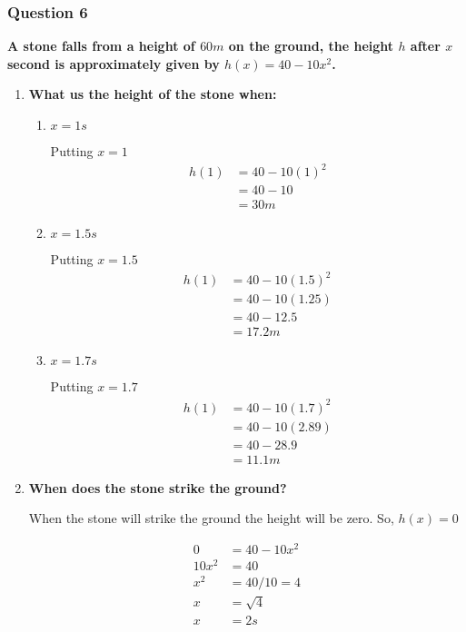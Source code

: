\documentclass[crop=false,fleqn]{standalone}
\begin{document}
    \subsubsection{Question 6}
    \textbf{
        A stone falls from a height of $60m$ on the ground, the height $h$
        after $x$ second is approximately given by $h(x)=40-10x^2$.
    }

    \begin{enumerate}
        \item \textbf{What us the height of the stone when:}
        \begin{enumerate}
            \item $x = 1s$
            
            Putting $x=1$
            \begin{align*}
                h(1) &= 40-10(1)^2 \\
                    &= 40-10 \\
                    &= 30m
            \end{align*}

            \item $x = 1.5s$
            
            Putting $x=1.5$
            \begin{align*}
                h(1) &= 40-10(1.5)^2 \\
                    &= 40-10(1.25) \\
                    &= 40-12.5 \\
                    &= 17.2m
            \end{align*}

            \item $x = 1.7s$
            
            Putting $x=1.7$
            \begin{align*}
                h(1) &= 40-10(1.7)^2 \\
                    &= 40-10(2.89) \\
                    &= 40-28.9 \\
                    &= 11.1m
            \end{align*}
        \end{enumerate}
        \item \textbf{When does the stone strike the ground?}
        
        When the stone will strike the ground the height will be zero. So, $h(x)=0$

        \begin{align*}
            0 &= 40-10x^2 \\
            10x^2 &= 40 \\
            x^2 &= 40/10 = 4 \\
            x &= \sqrt{4} \\
            x &= 2s
        \end{align*}
    \end{enumerate}
\end{document}

